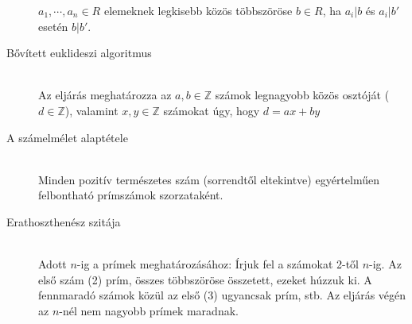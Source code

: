 \documentclass[margin=0px]{article}
\newcommand{\Z}{\mathbb{Z}}
\begin{document}
\begin{description}
						$a_1,\cdots,a_n \in R$ elemeknek legkisebb közös többszöröse $b\in R$, ha $a_i|b$ és $a_i|b'$ esetén $b|b'$.
					\item[Bővített euklideszi algoritmus] \hfill \\
						Az eljárás meghatározza az $a,b \in \Z$ számok legnagyobb közös osztóját ($d\in\Z$), valamint $x,y \in\Z$ számokat úgy, hogy $d = ax+by$
					\item[A számelmélet alaptétele] \hfill \\
						Minden pozitív természetes szám (sorrendtől eltekintve) egyértelműen felbontható prímszámok szorzataként.
					\item[Erathoszthenész szitája] \hfill \\
						Adott $n$-ig a prímek meghatározásához:
						Írjuk fel a számokat 2-től $n$-ig. Az első szám (2) prím, összes többszöröse összetett, ezeket húzzuk ki. A fennmaradó számok közül az első (3) ugyancsak prím, stb.  Az eljárás végén az $n$-nél nem nagyobb prímek maradnak.
				\end{description}
\end{document}
